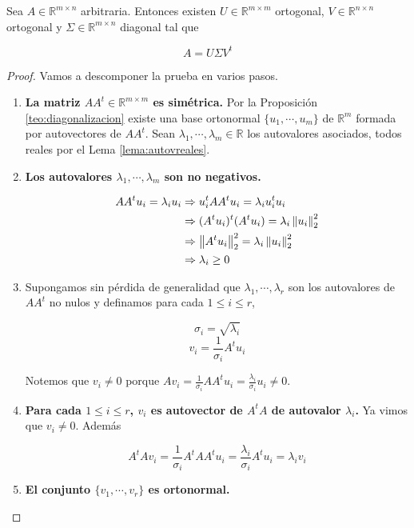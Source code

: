 \begin{teo}
Sea $A \in \mathbb{R}^{m \times n}$ arbitraria. Entonces existen $U \in \mathbb{R}^{m \times m}$ ortogonal, $V \in \mathbb{R}^{n \times n}$ ortogonal y $\Sigma \in \mathbb{R}^{m \times n}$ diagonal tal que

\[A = U \Sigma V^t\]

\begin{proof}
Vamos a descomponer la prueba en varios pasos.

\begin{enumerate}
\item \textbf{La matriz $AA^t \in \mathbb{R}^{m \times m}$ es simétrica.} Por la Proposición \ref{teo:diagonalizacion} existe una base ortonormal $\{u_1, \cdots, u_m\}$ de $\mathbb{R}^m$ formada por autovectores de $AA^t$. Sean $\lambda_1, \cdots, \lambda_m \in \mathbb{R}$ los autovalores asociados, todos reales por el Lema \ref{lema:autovreales}.

\item \textbf{Los autovalores $\lambda_1, \cdots, \lambda_m$ son no negativos.}

\begin{align*}
AA^tu_i = \lambda_i u_i 	&\Rightarrow u_i^t AA^t u_i = \lambda_i u_i^t u_i\\
						&\Rightarrow (A^tu_i)^t(A^tu_i) = \lambda_i \left\lVert u_i\right\rVert_2^2\\
						&\Rightarrow \left\lVert A^tu_i\right\rVert_2^2 = \lambda_i \left\lVert u_i\right\rVert_2^2\\
						&\Rightarrow \lambda_i \geq 0 
\end{align*}

\item Supongamos sin pérdida de generalidad que $\lambda_1, \cdots, \lambda_r$ son los autovalores de $AA^t$ no nulos y definamos para cada $1 \leq i \leq r$,

\[\sigma_i = \sqrt{\lambda_i}\]
\[v_i = \frac{1}{\sigma_i} A^t u_i\]

Notemos que $v_i \neq 0$ porque $Av_i = \frac{1}{\sigma_i} AA^t u_i = \frac{\lambda_i}{\sigma_i} u_i \neq 0$. 

\item \textbf{Para cada $1 \leq i \leq r$, $v_i$ es autovector de $A^tA$ de autovalor $\lambda_i$.} Ya vimos que $v_i \neq 0$. Además

\[A^tAv_i = \frac{1}{\sigma_i}A^tAA^tu_i = \frac{\lambda_i}{\sigma_i}A^tu_i = \lambda_i v_i\]

\item \textbf{El conjunto $\{v_1, \cdots, v_r\}$ es ortonormal.}


\end{enumerate}
\end{proof}
\end{teo}
